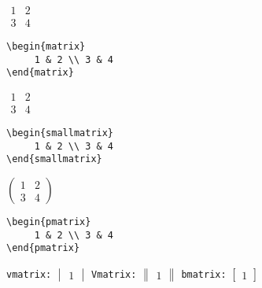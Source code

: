 \begin{minipage}{0.3\linewidth}
$\begin{matrix} 1 & 2 \\ 3 & 4 \end{matrix}$
\end{minipage}
%
\begin{minipage}{0.5\linewidth}
\begin{lstlisting}
\begin{matrix}
	 1 & 2 \\ 3 & 4 
\end{matrix}
\end{lstlisting}
\end{minipage}
\negAbstand
\begin{minipage}{0.3\linewidth}
$\begin{smallmatrix} 1 & 2 \\ 3 & 4 \end{smallmatrix}$
\end{minipage}
%
\begin{minipage}{0.5\linewidth}
\begin{lstlisting}
\begin{smallmatrix}
	 1 & 2 \\ 3 & 4
\end{smallmatrix}
\end{lstlisting}
\end{minipage}
\negAbstand
\begin{minipage}{0.3\linewidth}
$\begin{pmatrix} 1 & 2 \\ 3 & 4 \end{pmatrix}$
\end{minipage}
%
\begin{minipage}{0.5\linewidth}
\begin{lstlisting}
\begin{pmatrix}
	 1 & 2 \\ 3 & 4 
\end{pmatrix}
\end{lstlisting}
\end{minipage}
%
\verb|vmatrix:| $\begin{vmatrix} 1 \end{vmatrix}$
\qquad
\verb|Vmatrix:| $\begin{Vmatrix} 1 \end{Vmatrix}$
\qquad
\verb|bmatrix:| $\begin{bmatrix} 1 \end{bmatrix}$
